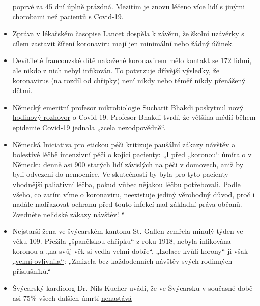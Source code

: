 \begin{itemize}
  poprvé za 45 dní \href{https://orf.at/stories/3162642/}{úplně
  prázdná}. Mezitím je znovu léčeno více lidí s jinými chorobami než
  pacientů s Covid-19.
\item
  Zpráva v lékařském časopise Lancet dospěla k závěru, že školní
  uzávěrky s cílem zastavit šíření koronaviru mají
  \href{https://www.thelancet.com/journals/lanchi/article/PIIS2352-4642(20)30095-X/fulltext}{jen
  minimální nebo žádný účinek}.
\item
  Devítileté francouzské dítě nakažené koronavirem mělo kontakt se 172
  lidmi, ale
  \href{https://www.n-tv.de/panorama/172-Kontaktpersonen-von-Corona-verschont-article21727469.html}{nikdo
  z nich nebyl infikován}. To potvrzuje dřívější výsledky, že
  koronavirus (na rozdíl od chřipky) není nikdy nebo téměř nikdy
  přenášený dětmi.
\item
  Německý emeritní profesor mikrobiologie Sucharit Bhakdi poskytnul
  \href{https://kenfm.de/kenfm-am-set-gespraech-mit-prof-dr-sucharit-bhakdi-zu-covid-19/}{nový
  hodinový rozhovor} o Covid-19. Profesor Bhakdi tvrdí, že většina médií
  během epidemie Covid-19 jednala „zcela nezodpovědně``.
\item
  Německá Iniciativa pro etickou péči
  \href{http://pflegeethik-initiative.de/2020/04/15/corona-krise-falsche-prioritaeten-gesetzt-und-ethische-prinzipien-verletzt/}{kritizuje}
  paušální zákazy návštěv a bolestivé léčbě intenzivní péčí o kojící
  pacienty: „I před „koronou`` úmíralo v Německu denně asi 900 starých
  lidí závislých na péči v domovech, aniž by byli odvezeni do nemocnice.
  Ve skutečnosti by byla pro tyto pacienty vhodnější paliativní léčba,
  pokud vůbec nějakou léčbu potřebovali. Podle všeho, co zatím víme o
  koronaviru, neexistuje jediný věrohodný důvod, proč i nadále
  nadřazovat ochranu před touto infekcí nad základní práva občanů.
  Zvedněte nelidské zákazy návštěv! ``
\item
  Nejstarší žena ve švýcarském kantonu St. Gallen zemřela minulý týden
  ve věku 109. Přežila „španělskou chřipku`` z roku 1918, nebyla
  infikována koronou a „na svůj věk si vedla velmi dobře``. „Izolace
  kvůli korony`` ji však
  \href{https://swprs.files.wordpress.com/2020/04/tagblatt-109.jpg}{„velmi
  ovlivnila``}: „Zmizela bez každodenních návštěv svých rodinných
  příslušníků.``
\item
  Švýcarský kardiolog Dr. Nils Kucher uvádí, že ve Švýcarsku v současné
  době asi 75\% všech dalších úmrtí
  \href{https://www.tagesspiegel.de/wissen/woran-sterben-corona-patienten-wirklich-ein-schweizer-forscher-macht-hoffnung-im-kampf-gegen-covid-19/25750666.html}{nenastává
}
\end{itemize}
